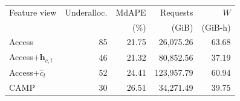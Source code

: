 \begin{tabular}{@{}lrrrr@{}}
\toprule
Feature view & Underalloc. & MdAPE & Requests & $W$\\
 & & (\%) & (GiB) & (GiB-h)\\
\midrule
Access & 85 & 21.75 & 26,075.26 & 63.68 \\
Access+$\mathbf{h}_{c,t}$ & 46 & 21.32 & 80,852.56 & 37.19 \\
Access+$\hat c_t$ & 52 & 24.41 & 123,957.79 & 60.94 \\
CAMP & 30 & 26.51 & 34,271.49 & 39.75 \\
\bottomrule
\end{tabular}
